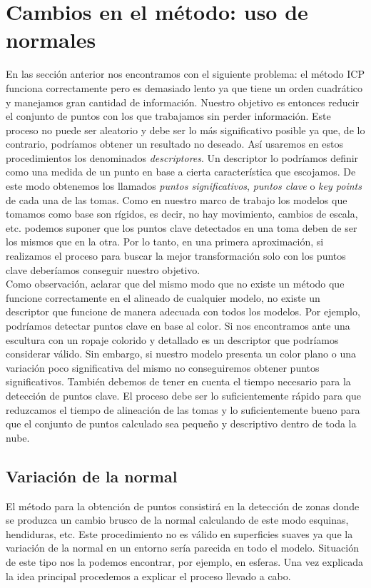 \chapter{Cambios en el método: uso de normales}
En las sección anterior nos encontramos con el siguiente problema: el método ICP funciona correctamente pero es demasiado lento ya que tiene un orden cuadrático y manejamos gran cantidad de información. Nuestro objetivo es entonces reducir el conjunto de puntos con los que trabajamos sin perder información. Este proceso no puede ser aleatorio y debe ser lo más significativo posible ya que, de lo contrario, podríamos obtener un resultado no deseado. Así usaremos en estos procedimientos los denominados \textit{descriptores}. Un descriptor lo podríamos definir como una medida de un punto en base a cierta característica que escojamos. De este modo obtenemos los llamados \textit{puntos significativos}, \textit{puntos clave} o \textit{key points} de cada una de las tomas. Como en nuestro marco de trabajo los modelos que tomamos como base son rígidos, es decir, no hay movimiento, cambios de escala, etc. podemos suponer que los puntos clave detectados en una toma deben de ser los mismos que en la otra. Por lo tanto, en una primera aproximación,  si realizamos el proceso para buscar la mejor transformación solo con los puntos clave deberíamos conseguir nuestro objetivo. \\

Como observación, aclarar que del mismo modo que no existe un método que funcione correctamente en el alineado de cualquier modelo, no existe un descriptor que funcione de manera adecuada con todos los modelos. Por ejemplo, podríamos detectar puntos clave en base al color. Si nos encontramos ante una escultura con un ropaje colorido y detallado es un descriptor que podríamos considerar válido. Sin embargo, si nuestro modelo presenta un color plano o una variación poco significativa del mismo no conseguiremos obtener puntos significativos. También debemos de tener en cuenta el tiempo necesario para la detección de puntos clave. El proceso debe ser lo suficientemente rápido para que reduzcamos el tiempo de alineación de las tomas y lo suficientemente bueno para que el conjunto de puntos calculado sea pequeño y descriptivo dentro de toda la nube.

\section{Variación de la normal}\label{varNormal}
El método para la obtención de puntos consistirá en la detección de zonas donde se produzca un cambio brusco de la normal calculando de este modo esquinas, hendiduras, etc.  Este procedimiento no es válido en superficies suaves ya que la variación de la normal en un entorno sería parecida en todo el modelo. Situación de este tipo nos la podemos encontrar, por ejemplo, en esferas. Una vez explicada la idea principal procedemos a explicar el proceso llevado a cabo. \\

